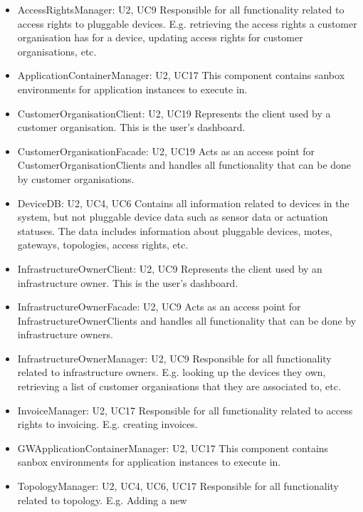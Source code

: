     \begin{itemize}
        \item AccessRightsManager: U2, UC9
            Responsible for all functionality related to access rights to pluggable devices.
            E.g. retrieving the access rights a customer organisation has for a device,
            updating access rights for customer organisations, etc.
        \item ApplicationContainerManager: U2, UC17
            This component contains sanbox environments for application instances to execute in.
        \item CustomerOrganisationClient: U2, UC19
            Represents the client used by a customer organisation. This is the user's dashboard.
        \item CustomerOrganisationFacade: U2, UC19
            Acts as an access point for CustomerOrganisationClients and handles all functionality that can be done by customer organisations.
        \item DeviceDB: U2, UC4, UC6
            Contains all information related to devices in the system, but not pluggable device
            data such as sensor data or actuation statuses. The data includes
            information about pluggable devices, motes, gateways, topologies,
            access rights, etc.
        \item InfrastructureOwnerClient: U2, UC9
            Represents the client used by an infrastructure owner. This is the user's dashboard.
        \item InfrastructureOwnerFacade: U2, UC9
            Acts as an access point for InfrastructureOwnerClients and handles all functionality that can be done by infrastructure owners.
        \item InfrastructureOwnerManager: U2, UC9
            Responsible for all functionality related to infrastructure owners. E.g.
            looking up the devices they own, retrieving a list of customer
            organisations that they are associated to, etc.
        \item InvoiceManager: U2, UC17
            Responsible for all functionality related to access rights to invoicing.
            E.g. creating invoices.
        \item GWApplicationContainerManager: U2, UC17
            This component contains sanbox environments for application instances to execute in.
        \item TopologyManager: U2, UC4, UC6, UC17
              Responsible for all functionality related to topology. E.g. Adding a new

\end{itemize}
